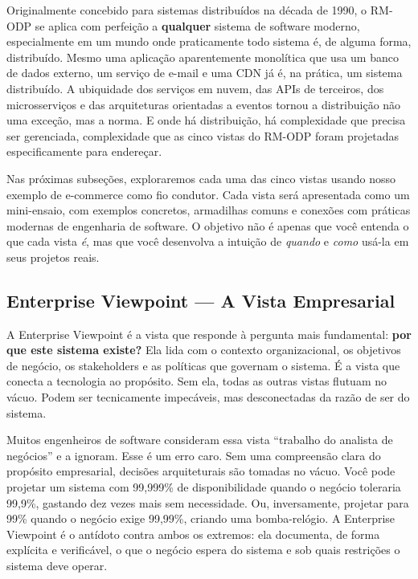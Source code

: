 Originalmente concebido para sistemas distribuídos na década de 1990, o RM-ODP
se aplica com perfeição a \textbf{qualquer} sistema de software moderno,
especialmente em um mundo onde praticamente todo sistema é, de alguma forma,
distribuído. Mesmo uma aplicação aparentemente monolítica que usa um banco de
dados externo, um serviço de e-mail e uma CDN já é, na prática, um sistema
distribuído. A ubiquidade dos serviços em nuvem, das APIs de terceiros, dos
microsserviços e das arquiteturas orientadas a eventos tornou a distribuição não
uma exceção, mas a norma. E onde há distribuição, há complexidade que precisa ser
gerenciada, complexidade que as cinco vistas do RM-ODP foram projetadas
especificamente para endereçar.

Nas próximas subseções, exploraremos cada uma das cinco vistas usando nosso
exemplo de e-commerce como fio condutor. Cada vista será apresentada como um
mini-ensaio, com exemplos concretos, armadilhas comuns e conexões com práticas
modernas de engenharia de software. O objetivo não é apenas que você entenda
o que cada vista \emph{é}, mas que você desenvolva a intuição de \emph{quando}
e \emph{como} usá-la em seus projetos reais.

\subsection{Enterprise Viewpoint --- A Vista Empresarial}

A Enterprise Viewpoint é a vista que responde à pergunta mais fundamental:
\textbf{por que este sistema existe?} Ela lida com o contexto organizacional,
os objetivos de negócio, os stakeholders e as políticas que governam o sistema.
É a vista que conecta a tecnologia ao propósito. Sem ela, todas as outras
vistas flutuam no vácuo. Podem ser tecnicamente impecáveis, mas
desconectadas da razão de ser do sistema.

Muitos engenheiros de software consideram essa vista ``trabalho do analista de
negócios'' e a ignoram. Esse é um erro caro. Sem uma compreensão clara do
propósito empresarial, decisões arquiteturais são tomadas no vácuo. Você pode
projetar um sistema com 99,999\% de disponibilidade quando o negócio toleraria
99,9\%, gastando dez vezes mais sem necessidade. Ou, inversamente, projetar
para 99\% quando o negócio exige 99,99\%, criando uma bomba-relógio. A
Enterprise Viewpoint é o antídoto contra ambos os extremos: ela documenta, de
forma explícita e verificável, o que o negócio espera do sistema e sob quais
restrições o sistema deve operar.

